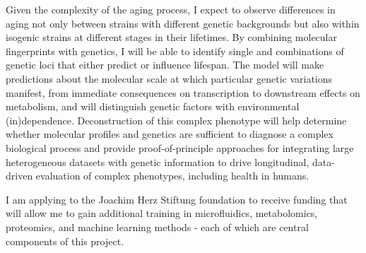 \documentclass[a4paper,10pt,sans]{article}
\begin{document}
Given the complexity of the aging process, I expect to observe differences in aging not only between strains with different genetic backgrounds but also within isogenic strains at different stages in their lifetimes. By combining molecular fingerprints with genetics, I will be able to identify single and combinations of genetic loci that either predict or influence lifespan. The model will make predictions about the molecular scale at which particular genetic variations manifest, from immediate consequences on transcription to downstream effects on metabolism, and will distinguish genetic factors with environmental (in)dependence. Deconstruction of this complex phenotype will help determine whether molecular profiles and genetics are sufficient to diagnose a complex biological process and provide proof-of-principle approaches for integrating large heterogeneous datasets with genetic information to drive longitudinal, data-driven evaluation of complex phenotypes, including health in humans.  

I am applying to the Joachim Herz Stiftung foundation to receive funding that will allow me to gain additional training in microfluidics, metabolomics, proteomics, and machine learning methods - each of which are central components of this project.
\end{document}

